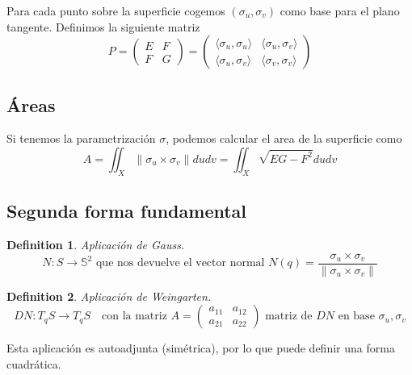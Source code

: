 \documentclass[leqno]{article}
\newtheorem*{definition}{Definition}
\begin{document}
Para cada punto sobre la superficie cogemos  $(\sigma_u, \sigma_v)$ como base para el plano tangente. Definimos la siguiente matriz
\[
P =   \begin{pmatrix} E & F \\ F & G \end{pmatrix} = \begin{pmatrix} \langle \sigma_u , \sigma_u \rangle & \langle \sigma_u , \sigma_v \rangle \\ \langle \sigma_u , \sigma_v \rangle & \langle \sigma_v , \sigma_v \rangle   \end{pmatrix} 
\] 





\subsection{Áreas}
Si tenemos la parametrización $\sigma $, podemos calcular el area de la superficie como
\[
A = \iint_X\|\sigma _u\times \sigma _v\|dudv=  \iint_X \sqrt{EG-F^2}dudv
\] 

\subsection{Segunda forma fundamental}
\begin{definition}
Aplicación de Gauss.
\[
N: S\to \mathbb{S}^2 \text{ que nos devuelve el vector normal } N(q) = \frac{\sigma _u\times \sigma _v}{\|\sigma _u\times \sigma _v\|}
\] 		
\end{definition}

\begin{definition}
Aplicación de Weingarten.
\[
  DN: T_qS \to T_qS \quad \text{con la matriz } A = \begin{pmatrix} a_{11} & a_{12} \\ a_{21} & a_{22} \end{pmatrix} \text{ matriz de } DN \text{ en base }\sigma _u, \sigma _v 
\] 
\end{definition}

Esta aplicación es autoadjunta (simétrica), por lo que puede definir una forma cuadrática.
\end{document}
